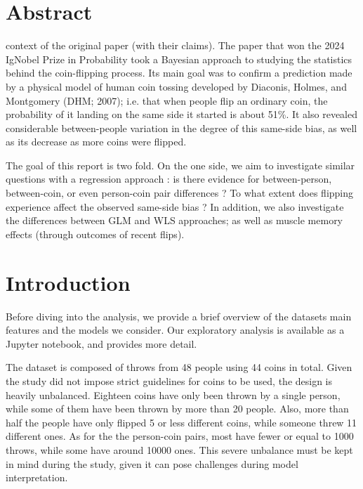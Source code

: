 \documentclass[a4paper, 12pt,oneside]{article}
\begin{document}
 
	 
	\clearpage
	\tableofcontents
	\thispagestyle{empty}
	\vspace{2cm}
	\section*{Abstract}
		context of the original paper (with their claims). The paper that won the 2024 IgNobel Prize in Probability took a Bayesian approach to studying the statistics behind the coin-flipping process. Its main goal was to confirm a prediction made by a physical model of human coin tossing developed by Diaconis, Holmes, and Montgomery (DHM; 2007); i.e. that when people flip an ordinary coin, the probability of it landing on the same side it started is about 51\%. 
		It also revealed considerable between-people variation in the degree of this same-side bias, as well as its decrease as more coins were flipped. 

		The goal of this report is two fold. On the one side, we aim to investigate similar questions with a regression approach : 
		is there evidence for between-person, between-coin, or even person-coin pair differences ? To what extent does flipping experience affect the observed same-side bias ?
		In addition, we also investigate the differences between GLM and WLS approaches; as well as muscle memory effects (through outcomes of recent flips). 
	\clearpage
	\setcounter{page}{1}
	\section{Introduction}
		Before diving into the analysis, we provide a brief overview of the datasets main features and the models we consider. Our exploratory analysis is available as a Jupyter notebook, and provides more detail. 

		The dataset is composed of throws from 48 people using 44 coins in total. Given the study did not impose strict guidelines for coins to be used, the design is heavily unbalanced. Eighteen coins have only been thrown by a single person, while some of them have been thrown by more than 20 people. Also, more than half the people have only flipped 5 or less different coins, while someone threw 11 different ones. As for the the person-coin pairs, most have fewer or equal to 1000 throws, while some have around 10000 ones. This severe unbalance must be kept in mind during the study, given it can pose challenges during model interpretation. 
\end{document}
